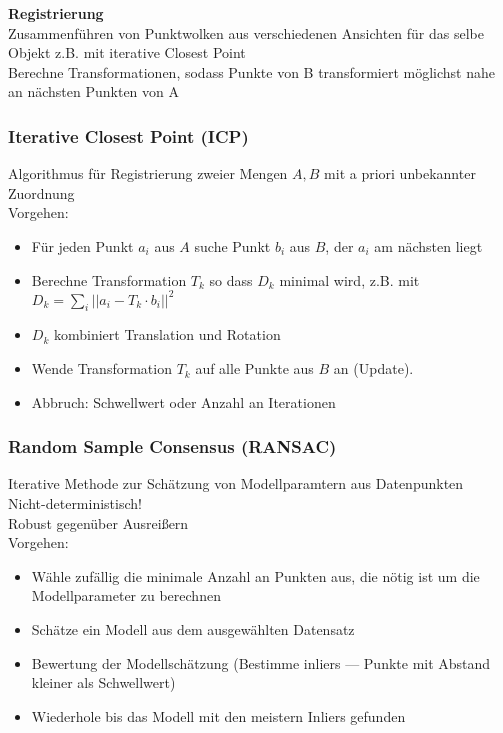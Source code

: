 \textbf{Registrierung}\\
Zusammenführen von Punktwolken aus verschiedenen Ansichten für das selbe Objekt
z.B. mit iterative Closest Point\\
Berechne Transformationen, sodass Punkte von B transformiert möglichst nahe an nächsten Punkten von A

\subsubsection{Iterative Closest Point (ICP)}
Algorithmus für Registrierung zweier Mengen \(A,B\) mit a priori unbekannter Zuordnung\\
Vorgehen:
\begin{itemize}
\item Für jeden Punkt \(a_i\) aus \(A\) suche Punkt \(b_i\) aus \(B\), der \(a_i\) am nächsten liegt
\item Berechne Transformation \(T_k\) so dass \(D_k\) minimal wird, z.B. mit
  \(D_k = \sum_i || a_i - T_k \cdot b_i ||^2\)
\item \(D_k\) kombiniert Translation und Rotation
\item Wende Transformation \(T_k\) auf alle Punkte aus \(B\) an (Update).
\item Abbruch: Schwellwert oder Anzahl an Iterationen
\end{itemize}

\subsubsection{Random Sample Consensus (RANSAC)}
Iterative Methode zur Schätzung von Modellparamtern aus Datenpunkten\\
Nicht-deterministisch!\\
Robust gegenüber Ausreißern\\
Vorgehen:
\begin{itemize}
\item Wähle zufällig die minimale Anzahl an Punkten aus, die nötig ist um die Modellparameter zu berechnen
\item Schätze ein Modell aus dem ausgewählten Datensatz
\item Bewertung der Modellschätzung (Bestimme inliers --- Punkte mit Abstand kleiner als Schwellwert)
\item Wiederhole bis das Modell mit den meistern Inliers gefunden
\end{itemize}

